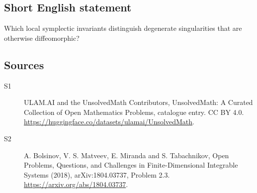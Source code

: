 \documentclass[11pt]{article}
\begin{document}
\subsection{Short English statement}
Which local symplectic invariants distinguish degenerate singularities that are otherwise diffeomorphic?
\subsection{Sources}
\begin{description}
\item[\hypertarget{source:statement:1}{S1}] ULAM.AI and the UnsolvedMath Contributors, UnsolvedMath: A Curated Collection of Open Mathematics Problems, catalogue entry. CC BY 4.0. \url{https://huggingface.co/datasets/ulamai/UnsolvedMath}.
\item[\hypertarget{source:statement:2}{S2}] A. Bolsinov, V. S. Matveev, E. Miranda and S. Tabachnikov, Open Problems, Questions, and Challenges in Finite-Dimensional Integrable Systems (2018), arXiv:1804.03737, Problem 2.3. \url{https://arxiv.org/abs/1804.03737}.
\end{description}
\label{end:statement}
\end{document}
